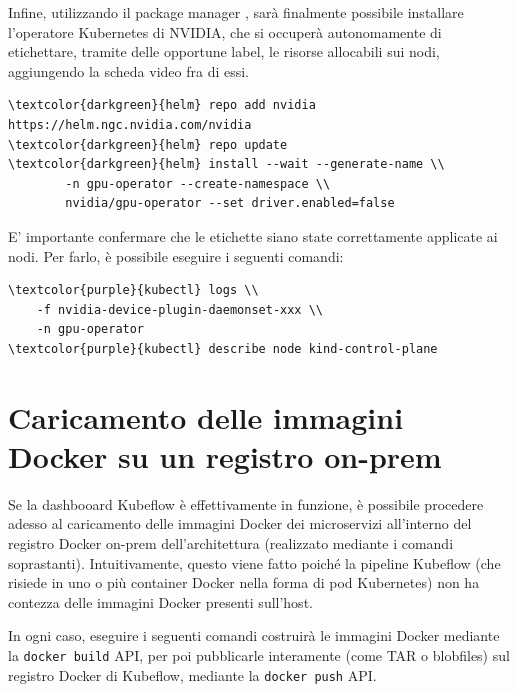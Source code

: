 Infine, utilizzando il package manager , sarà finalmente possibile installare l'operatore Kubernetes di NVIDIA, che si occuperà autonomamente di etichettare, tramite delle opportune label, le risorse allocabili sui nodi, aggiungendo la scheda video fra di essi.

\begin{small}
\begin{Verbatim}[commandchars=\\\{\}]
\textcolor{darkgreen}{helm} repo add nvidia https://helm.ngc.nvidia.com/nvidia
\textcolor{darkgreen}{helm} repo update
\textcolor{darkgreen}{helm} install --wait --generate-name \\
        -n gpu-operator --create-namespace \\
        nvidia/gpu-operator --set driver.enabled=false
\end{Verbatim}
\end{small}

E' importante confermare che le etichette siano state correttamente applicate ai nodi. Per farlo, è possibile eseguire i seguenti comandi:

\begin{small}
\begin{Verbatim}[commandchars=\\\{\}]
\textcolor{purple}{kubectl} logs \\
    -f nvidia-device-plugin-daemonset-xxx \\
    -n gpu-operator
\textcolor{purple}{kubectl} describe node kind-control-plane
\end{Verbatim}
\end{small}

\section{Caricamento delle immagini Docker su un registro on-prem}

Se la dashbooard Kubeflow è effettivamente in funzione, è possibile procedere adesso al caricamento delle immagini Docker dei microservizi all'interno del registro Docker on-prem dell'architettura (realizzato mediante i comandi soprastanti). Intuitivamente, questo viene fatto poiché la pipeline Kubeflow (che risiede in uno o più container Docker nella forma di pod Kubernetes) non ha contezza delle immagini Docker presenti sull'host.

In ogni caso, eseguire i seguenti comandi costruirà le immagini Docker mediante la {\small \verb|docker build|} API, per poi pubblicarle interamente (come TAR o blobfiles) sul registro Docker di Kubeflow, mediante la {\small \verb|docker push|} API.

